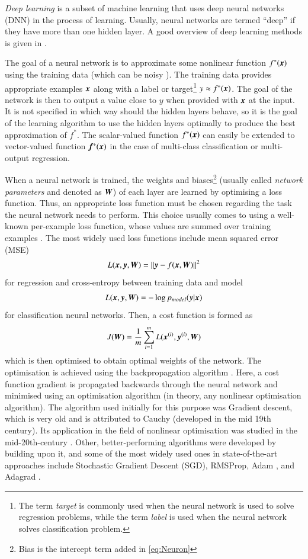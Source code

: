 \emph{Deep learning} is a subset of machine learning that uses deep neural networks (DNN) in the process of learning. Usually, neural networks are termed ``deep'' if they have more than one hidden layer. A good overview of deep learning methods is given in \cite{Haykin1999,Schmidhuber2015,Goodfellow2016}.

The goal of a neural network is to approximate some nonlinear function $f^{*}({\bm{x}})$ using the training data (which can be noisy \cite{Goodfellow2016}). The training data provides appropriate examples ${\bm{x}}$ along with a label or target\footnote{The term \emph{target} is commonly used when the neural network is used to solve regression problems, while the term \emph{label} is used when the neural network solves classification problem.} $y\approx f^{*}({\bm{x}})$. The goal of the network is then to output a value close to $y$ when provided with ${\bm{x}}$ at the input. It is not specified in which way should the hidden layers behave, so it is the goal of the learning algorithm to use the hidden layers optimally to produce the best approximation of $f^{*}$. The scalar-valued function $f^*({\bm{x}})$ can easily be extended to vector-valued function ${\bm{f}}^*({\bm{x}})$ in the case of multi-class classification or multi-output regression.

When a neural network is trained, the weights and biases\footnote{Bias is the intercept term added in \cref{eq:Neuron}} (usually called \emph{network parameters} and denoted as ${\bm{W}}$) of each layer are learned by optimising a loss function. Thus, an appropriate loss function must be chosen regarding the task the neural network needs to perform. This choice usually comes to using a well-known per-example loss function, whose values are summed over training examples \cite{Goodfellow2016}. The most widely used loss functions include mean squared error (MSE)
\[
    L({\bm{x}},{\bm{y}},{\bm{W}}) = ||{\bm{y}}-f({\bm{x}},{\bm{W}})||^2
\]
for regression and cross-entropy between training data and model
\[
    L({\bm{x}},{\bm{y}},{\bm{W}}) = -\log p_{model}({\bm{y}}|{\bm{x}})
\]
for classification neural networks. Then, a cost function is formed as
\[
    J({\bm{W}}) = \frac{1}{m}\sum_{i=1}^m L({\bm{x}}^{(i)}, {\bm{y}}^{(i)}, {\bm{W}})
    \label{Eq:CostFunction}\\
\]
which is then optimised to obtain optimal weights of the network. The optimisation is achieved using the backpropagation algorithm \cite{Rumelhart1986}. Here, a cost function gradient is propagated backwards through the neural network and minimised using an optimisation algorithm (in theory, any nonlinear optimisation algorithm). The algorithm used initially for this purpose was Gradient descent, which is very old and is attributed to Cauchy (developed in the mid 19th century). Its application in the field of nonlinear optimisation was studied in the mid-20th-century \cite{Curry1944}. Other, better-performing algorithms were developed by building upon it, and some of the most widely used ones in state-of-the-art approaches include Stochastic Gradient Descent (SGD), RMSProp, Adam \cite{Kingma2014}, and Adagrad \cite{Duchi2011}.


